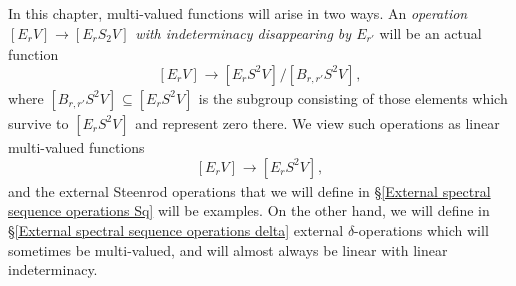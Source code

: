 \documentclass[11pt]{amsart} \renewcommand{\baselinestretch}{1.2}
\theoremstyle{plain}
\numberwithin{equation}{section} %
\theoremstyle{plain}
\numberwithin{equation}{chapter} %
\renewcommand{\to}{\longrightarrow}
\newcommand{\Edown}[4]{[E_{#1}#2]^{#3}_{#4}}
\newcommand{\EBdown}[4]{[B_{#1}#2]^{#3}_{#4}}
\begin{document}
\begin{second quadrant homotopy sseq operations}
In this chapter, multi-valued functions will arise in two ways. %
An \emph{operation $\Edown{r}{V}{}{}\to \Edown{r}{S_2V}{}{}$ with indeterminacy disappearing by $E_{r'}$} will be an actual function 
\[\Edown{r}{V}{}{}\to \Edown{r}{S^2V}{}{}/\EBdown{r,r'}{S^2V}{}{},\]
where $\EBdown{r,r'}{S^2V}{}{}\subseteq \Edown{r}{S^2V}{}{}$ is the subgroup consisting of those elements which survive to $\Edown{r}{S^2V}{}{}$ and represent zero there. We view such operations as linear multi-valued functions
\[\Edown{r}{V}{}{}\to \Edown{r}{S^2V}{}{},\]
and the external Steenrod operations that we will define in \S\ref{External spectral sequence operations Sq} will be examples.
On the other hand, we will define in \S\ref{External spectral sequence operations delta} external $\delta$-operations which will sometimes be multi-valued, and will almost always be linear with linear indeterminacy. %



\end{second quadrant homotopy sseq operations}
\end{document}
